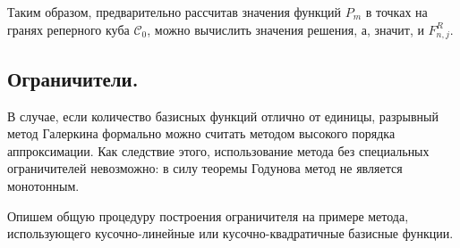 \documentclass[14pt, a4paper, fleqn]{extreport}
\begin{document}
	Таким образом, предварительно рассчитав значения функций $P_m$
	в точках на гранях реперного куба $\mathcal{C}_0$, можно вычислить значения решения,
	а, значит, и $F_{n,j}^R$.
	
	\subsection{Ограничители.}

	В случае, если количество базисных функций отлично от единицы, 
	разрывный метод Галеркина формально можно считать методом высокого порядка аппроксимации.
	Как следствие этого, использование метода без специальных ограничителей невозможно:
	в силу теоремы Годунова метод не является монотонным.
	
	Опишем общую процедуру построения ограничителя на примере метода,
	использующего кусочно-линейные или кусочно-квадратичные базисные функции.
	
\end{document}
